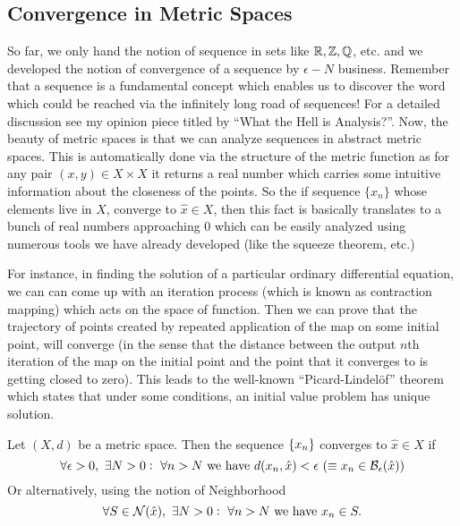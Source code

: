 \subsection{Convergence in Metric Spaces}
So far, we only hand the notion of sequence in sets like $\mathbb{R},\mathbb{Z},\mathbb{Q}$, etc. and we developed the notion of convergence of a sequence by $\epsilon-N$ business. Remember that a sequence is a fundamental concept which enables us to discover the word which could be reached via the infinitely long road of sequences! For a detailed discussion see my opinion piece titled by ``What the Hell is Analysis?''. Now, the beauty of metric spaces is that we can analyze sequences in abstract metric spaces. This is automatically done via the structure of the metric function as for any pair $(x,y)\in X\times X$ it returns a real number which carries some intuitive information about the closeness of the points. So the if sequence $\{x_n\}$ whose elements live in $X$, converge to $\hat{x}\in X$, then this fact is basically translates to a bunch of real numbers approaching $0$ which can be easily analyzed using numerous tools we have already developed (like the squeeze theorem, etc.)

For instance, in finding the solution of a particular ordinary differential equation, we can can come up with an iteration process (which is known as contraction mapping) which acts on the space of function. Then we can prove that the trajectory of points created by repeated application of the map on some initial point, will converge (in the sense that the distance between the output $n$th iteration of the map on the initial point and the point that it converges to is getting closed to zero). This leads to the well-known ``Picard-Lindelöf'' theorem which states that under some conditions, an initial value problem has unique solution.

\begin{defbox}
	Let $(X,d)$ be a metric space. Then the sequence $\{x_n\}$ converges to $\hat{x}\in X$ if
	\[ \forall \epsilon>0,\ \exists N>0:\ \forall n>N \wh d(x_n,\hat{x})<\epsilon\ (\equiv  x_n \in \ball{\epsilon}{\hat{x}}) \]
	Or alternatively, using the notion of Neighborhood
	\[ \forall S \in \mathcal{N}(\hat{x}),\ \exists N>0:\ \forall n>N \ \text{we have}\  x_n \in S.  \]
\end{defbox}


